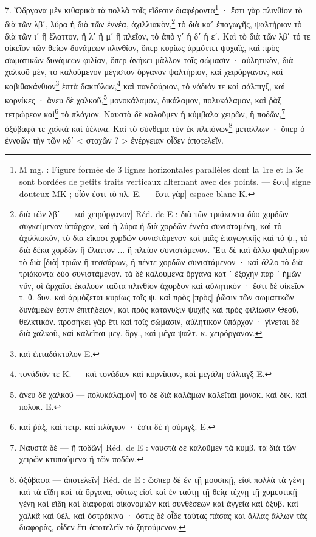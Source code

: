 \documentclass[a4paper, 11pt, oneside, polutonikogreek, french]{article}
\begin{document}
7. Ὄδργανα μὲν κιθαρικὰ τὰ πολλὰ τοῖς εἴδεσιν διαφέροντα\footnote{M mg. : Figure formée de 3 lignes horizontales parallèles dont la 1re et la 3e sont bordées de petits traits verticaux alternant avec des points. --- ἔστι] signe douteux MK ; οἷόν ἐστι τὸ πλ. E. --- ἔστι γὰρ] espace blanc K.} · ἔστι γὰρ πλινθίον τὸ διὰ τῶν λβʹ, λύρα ἡ διὰ τῶν ἐννέα, ἀχιλλιακὸν,\footnote{διὰ τῶν λβʹ --- καὶ χειρόργανον] Réd. de E : διὰ τῶν τριάκοντα δύο χορδῶν συγκείμενον ὑπάρχον, καὶ ἡ λύρα ἡ διὰ χορδῶν ἐννέα συνισταμένη, καὶ τὸ ἀχιλλιακὸν, τὸ διὰ εἴκοσι χορδῶν συνιστάμενον καὶ μιᾶς ἐπαγωγικῆς καὶ τὸ ψ., τὸ διὰ δέκα χορδῶν ἢ ἔλαττον ... ἢ πλείον συνιστάμενον. Ἔτι δὲ καὶ ἄλλο ψαλτήριον τὸ διὰ [διὰ] τριῶν ἢ τεσσάρων, ἢ πέντε χορδῶν συνιστάμενον · καὶ ἄλλο τὸ διὰ τριάκοντα δύο συνιστάμενον. τὰ δὲ καλούμενα ὄργανα κατ ᾽ ἐξοχὴν παρ ᾽ ἡμῶν νῦν, οἱ ἀρχαῖοι ἐκάλουν ταῦτα πλινθίον ἄχορδον καὶ αὐλητικόν · ἔστι δὲ οἰκεῖον τ. θ. δυν. καὶ ἁρμόζεται κυρίως ταῖς ψ. καὶ πρὸς [πρὸς] ῥῶσιν τῶν σωματικῶν δυνάμεών ἐστιν ἐπιτήδειον, καὶ πρὸς κατάνυξιν ψυχῆς καὶ πρὸς φιλίωσιν Θεοῦ, θελκτικόν. προσήκει γὰρ ἔτι καὶ τοῖς σώμασιν, αὐλητικὸν ὑπάρχον · γίνεται δὲ διὰ χαλκοῦ, καὶ καλεῖται μεγ. ὄργ., καὶ μέγα ψαλτ. κ. χειρόργανον.} τὸ διὰ καʹ ἐπαγωγῆς, ψαλτήριον τὸ διὰ τῶν ιʹ ἢ ἔλαττον, ἢ λʹ ἣ μʹ ἢ πλεῖον, τὸ ἀπὸ γʹ ἢ δʹ ἢ εʹ. Καὶ τὸ διὰ τῶν λβʹ τό τε οἰκεῖον τῶν θείων δυνάμεων πλινθίον, ὅπερ κυρίως ἁρμόττει ψυχαῖς, καὶ πρὸς σωματικῶν δυνάμεων φιλίαν, ὅπερ ἀνήκει μᾶλλον τοῖς σώμασιν · αὐλητικὸν, διὰ χαλκοῦ μὲν, τὸ καλούμενον μέγιστον ὄργανον ψαλτήριον, καὶ χειρόργανον, καὶ καβιθακάνθιον\footnote{καὶ ἑπταδάκτυλον E.} ἑπτὰ δακτύλων,\footnote{τονάδιόν τε K. --- καὶ τονάδιον καὶ κορνίκιον, καὶ μεγάλη σάλπιγξ E.} καὶ πανδούριον, τὸ νάδιόν τε καὶ σάλπιγξ, καὶ κορνίκες · ἄνευ δὲ χαλκοῦ,\footnote{ἄνευ δὲ χαλκοῦ --- πολυκάλαμον] τὸ δὲ διὰ καλάμων καλεῖται μονοκ. καὶ δικ. καὶ πολυκ. E.} μονοκάλαμον, δικάλαμον, πολυκάλαμον, καὶ ῥὰξ τετρώρεον καὶ\footnote{καὶ ῥὰξ, καὶ τετρ. καὶ πλάγιον · ἔστι δὲ ἡ σύριγξ. E.} τὸ πλάγιον. Ναυστὰ δὲ καλοῦμεν ἢ κύμβαλα χειρῶν, ἢ ποδῶν,\footnote{Ναυστὰ δὲ --- ἢ ποδῶν] Réd. de E : ναυστὰ δὲ καλοῦμεν τὰ κυμβ. τὰ διὰ τῶν χειρῶν κτυπούμενα ἢ τῶν ποδῶν.} ὀξύβαφά τε χαλκὰ καὶ ὑέλινα. Καὶ τὸ σύνθεμα τὸν ἐκ πλειόνων\footnote{ὀξύβαφα --- ἀποτελεῖν] Réd. de E : ὥσπερ δὲ ἐν τῇ μουσικῇ, εἰσὶ πολλὰ τὰ γένη καὶ τὰ εἴδη καὶ τὰ ὄργανα, οὕτως εἰσὶ καὶ ἐν ταύτῃ τῇ θείᾳ τέχνῃ τῇ χυμευτικῇ γένη καὶ εἴδη καὶ διαφοραὶ οἰκονομιῶν καὶ συνθέσεων καὶ ἀγγεῖα καὶ ὀξυβ. καὶ χαλκᾶ καὶ ὑέλ. καὶ ὀστράκινα · ὅστις δὲ οἶδε ταύτας πάσας καὶ ἄλλας ἄλλων τὰς διαφορὰς, οἶδεν ἔτι ἀποτελεῖν τὸ ζητούμενον.} μετάλλων · ὅπερ ὁ ἐννοῶν τὴν τῶν κδʹ < στοχῶν ? > ἐνέργειαν οἶδεν ἀποτελεῖν.
\end{document}
